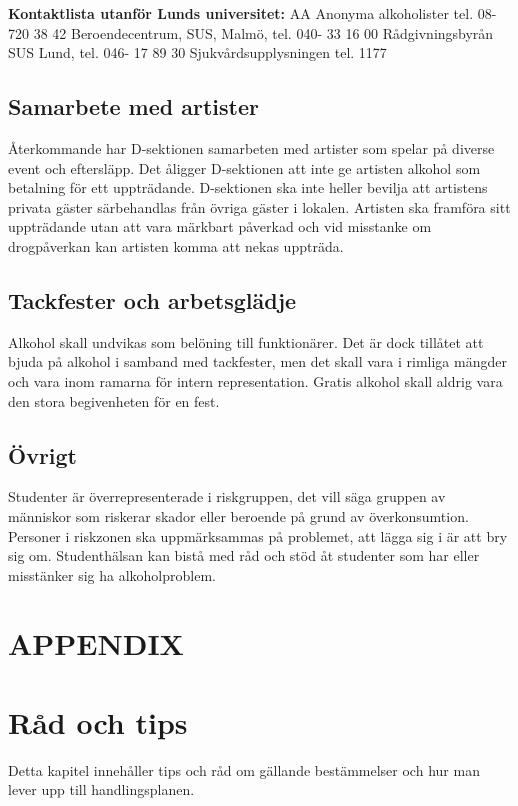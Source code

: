 \documentclass[]{dsekkallelse}
\begin{document}
\textbf{Kontaktlista utanför Lunds universitet:}\newline
AA Anonyma alkoholister tel. 08-720 38 42\newline
Beroendecentrum, SUS, Malmö, tel. 040- 33 16 00\newline
Rådgivningsbyrån SUS Lund, tel. 046- 17 89 30\newline
Sjukvårdsupplysningen tel. 1177

\subsection{Samarbete med artister}
Återkommande har D-sektionen samarbeten med artister som spelar på diverse event och eftersläpp. Det åligger D-sektionen att inte ge artisten alkohol som betalning för ett uppträdande. D-sektionen ska inte heller bevilja att artistens privata gäster särbehandlas
från övriga gäster i lokalen. Artisten ska framföra sitt uppträdande utan att vara märkbart
påverkad och vid misstanke om drogpåverkan kan artisten komma att nekas uppträda.

\subsection{Tackfester och arbetsglädje}
Alkohol skall undvikas som belöning till funktionärer. Det är dock tillåtet att bjuda på alkohol i samband med tackfester, men det skall vara i rimliga mängder och vara inom ramarna för intern representation. Gratis alkohol skall aldrig vara den stora begivenheten för en fest.

\subsection{Övrigt}
Studenter är överrepresenterade i riskgruppen, det vill säga gruppen av människor som riskerar skador eller beroende på grund av överkonsumtion. Personer i riskzonen ska uppmärksammas på problemet, att lägga sig i är att bry sig om. Studenthälsan kan bistå med råd och stöd åt studenter som har eller misstänker sig ha alkoholproblem.

\section*{APPENDIX}
\section{Råd och tips}
Detta kapitel innehåller tips och råd om gällande bestämmelser och hur man lever upp till
handlingsplanen.
\end{document}

